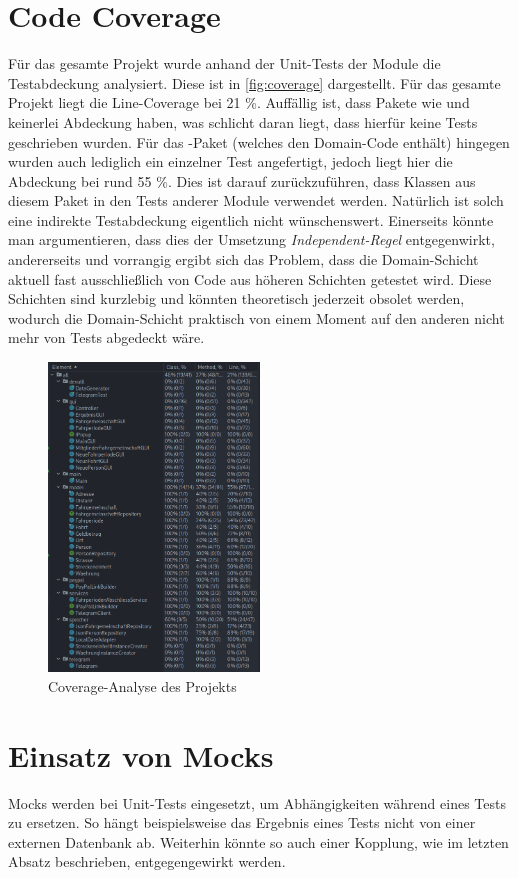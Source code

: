\section{Code Coverage}
Für das gesamte Projekt wurde anhand der Unit-Tests der Module die Testabdeckung analysiert.
Diese ist in \autoref{fig:coverage} dargestellt.
Für das gesamte Projekt liegt die Line-Coverage bei 21 \%.
Auffällig ist, dass Pakete wie  und  keinerlei Abdeckung haben, was schlicht daran liegt, dass hierfür keine Tests geschrieben wurden.
Für das -Paket (welches den Domain-Code enthält) hingegen wurden auch lediglich ein einzelner Test angefertigt, jedoch liegt hier die Abdeckung bei rund 55 \%.
Dies ist darauf zurückzuführen, dass Klassen aus diesem Paket in den Tests anderer Module verwendet werden.
Natürlich ist solch eine indirekte Testabdeckung eigentlich nicht wünschenswert.
Einerseits könnte man argumentieren, dass dies der Umsetzung \emph{Independent-Regel} entgegenwirkt, andererseits und vorrangig ergibt sich das Problem, dass die Domain-Schicht aktuell fast ausschließlich von Code aus höheren Schichten getestet wird.
Diese Schichten sind kurzlebig und könnten theoretisch jederzeit obsolet werden, wodurch die Domain-Schicht praktisch von einem Moment auf den anderen nicht mehr von Tests abgedeckt wäre.

\begin{figure}[H]
    \centering
    \includegraphics[width=0.5\textwidth]{Bilder/Coverage.png}
    \caption{Coverage-Analyse des Projekts}
    \label{fig:coverage}
\end{figure}

\section{Einsatz von Mocks}
Mocks werden bei Unit-Tests eingesetzt, um Abhängigkeiten während eines Tests zu ersetzen.
So hängt beispielsweise das Ergebnis eines Tests nicht von einer externen Datenbank ab.
Weiterhin könnte so auch einer Kopplung, wie im letzten Absatz beschrieben, entgegengewirkt werden.

